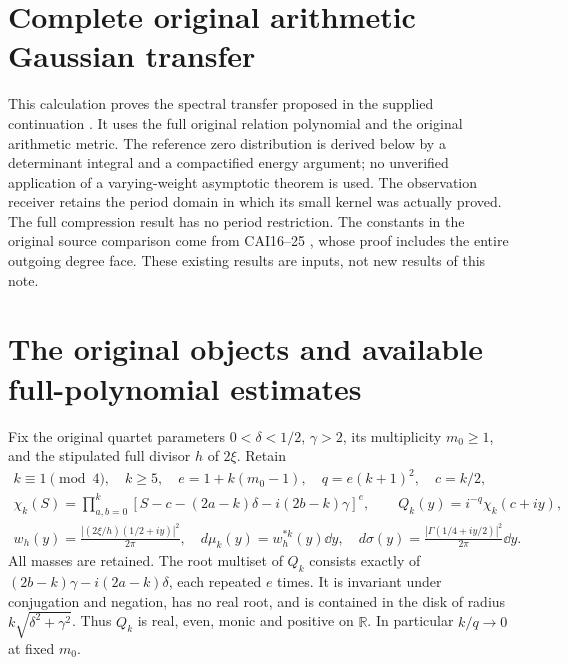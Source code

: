 \documentclass[11pt]{article}
\newcommand{\R}{\mathbb R}\newcommand{\C}{\mathbb C}
\begin{document}
\appendix
\clearpage
\section*{Complete original arithmetic Gaussian transfer}


This calculation proves the spectral transfer proposed in the supplied
continuation \cite{NGincoming}. It uses the full original relation polynomial
and the original arithmetic metric. The reference zero distribution is
derived below by a determinant integral and a compactified energy argument;
no unverified application of a varying-weight asymptotic theorem is used.
The observation receiver retains the period domain in which its small
kernel was actually proved. The full compression result has no period
restriction. The constants in the original source comparison come from
CAI16--25 \cite{cumulative}, whose proof includes the entire outgoing degree
face. These existing results are inputs, not new results of this note.

\section{The original objects and available full-polynomial estimates}
Fix the original quartet parameters $0<\delta<1/2$, $\gamma>2$, its
multiplicity $m_0\ge1$, and the stipulated full divisor $h$ of $2\xi$.
Retain
\begin{equation}\tag{NG1}
 \begin{gathered}
 k\equiv1\pmod4,\quad k\ge5,\quad e=1+k(m_0-1),\quad q=e(k+1)^2,\quad c=k/2,\\
 \chi_k(S)=\prod_{a,b=0}^k
 [S-c-(2a-k)\delta-i(2b-k)\gamma]^e,\qquad
 Q_k(y)=i^{-q}\chi_k(c+iy),\\
 w_h(y)=\frac{|(2\xi/h)(1/2+iy)|^2}{2\pi},\quad
 d\mu_k(y)=w_h^{*k}(y)\dd y,\quad
 d\sigma(y)=\frac{|\Gamma(1/4+iy/2)|^2}{2\pi}\dd y.
 \end{gathered}
\end{equation}
All masses are retained. The root multiset of $Q_k$ consists exactly of
$(2b-k)\gamma-i(2a-k)\delta$, each repeated $e$ times. It is invariant
under conjugation and negation, has no real root, and is contained in the
disk of radius $k\sqrt{\delta^2+\gamma^2}$. Thus $Q_k$ is real, even,
monic and positive on $\R$. In particular $k/q\to0$ at fixed $m_0$.
\end{document}
